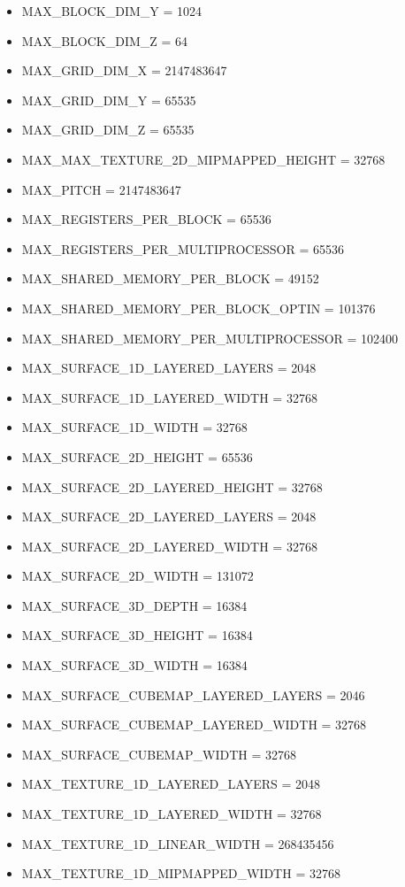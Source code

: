\documentclass{article}
\begin{document}
\begin{itemize}
    \item MAX\_BLOCK\_DIM\_Y = 1024
    \item MAX\_BLOCK\_DIM\_Z = 64
    \item MAX\_GRID\_DIM\_X = 2147483647
    \item MAX\_GRID\_DIM\_Y = 65535
    \item MAX\_GRID\_DIM\_Z = 65535
    \item MAX\_MAX\_TEXTURE\_2D\_MIPMAPPED\_HEIGHT = 32768
    \item MAX\_PITCH = 2147483647
    \item MAX\_REGISTERS\_PER\_BLOCK = 65536
    \item MAX\_REGISTERS\_PER\_MULTIPROCESSOR = 65536
    \item MAX\_SHARED\_MEMORY\_PER\_BLOCK = 49152
    \item MAX\_SHARED\_MEMORY\_PER\_BLOCK\_OPTIN = 101376
    \item MAX\_SHARED\_MEMORY\_PER\_MULTIPROCESSOR = 102400
    \item MAX\_SURFACE\_1D\_LAYERED\_LAYERS = 2048
    \item MAX\_SURFACE\_1D\_LAYERED\_WIDTH = 32768
    \item MAX\_SURFACE\_1D\_WIDTH = 32768
    \item MAX\_SURFACE\_2D\_HEIGHT = 65536
    \item MAX\_SURFACE\_2D\_LAYERED\_HEIGHT = 32768
    \item MAX\_SURFACE\_2D\_LAYERED\_LAYERS = 2048
    \item MAX\_SURFACE\_2D\_LAYERED\_WIDTH = 32768
    \item MAX\_SURFACE\_2D\_WIDTH = 131072
    \item MAX\_SURFACE\_3D\_DEPTH = 16384
    \item MAX\_SURFACE\_3D\_HEIGHT = 16384
    \item MAX\_SURFACE\_3D\_WIDTH = 16384
    \item MAX\_SURFACE\_CUBEMAP\_LAYERED\_LAYERS = 2046
    \item MAX\_SURFACE\_CUBEMAP\_LAYERED\_WIDTH = 32768
    \item MAX\_SURFACE\_CUBEMAP\_WIDTH = 32768
    \item MAX\_TEXTURE\_1D\_LAYERED\_LAYERS = 2048
    \item MAX\_TEXTURE\_1D\_LAYERED\_WIDTH = 32768
    \item MAX\_TEXTURE\_1D\_LINEAR\_WIDTH = 268435456
    \item MAX\_TEXTURE\_1D\_MIPMAPPED\_WIDTH = 32768

\end{itemize}
\end{document}

